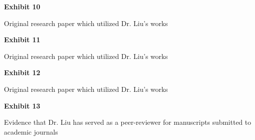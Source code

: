 \documentclass{article}
\begin{document}


\vspace*{\fill}

\begin{center}

{\LARGE \bf
Exhibit 10
}

\vspace{10\baselineskip}

{\large Original research paper which utilized Dr. Liu’s works}

\end{center}
\vspace*{\fill}



\vspace*{\fill}

\begin{center}

{\LARGE \bf
Exhibit 11
}

\vspace{10\baselineskip}

{\large Original research paper which utilized Dr. Liu’s works}

\end{center}
\vspace*{\fill}



\vspace*{\fill}

\begin{center}

{\LARGE \bf
Exhibit 12
}

\vspace{10\baselineskip}

{\large Original research paper which utilized Dr. Liu’s works}

\end{center}
\vspace*{\fill}





\vspace*{\fill}

\begin{center}

{\LARGE \bf
Exhibit 13
}

\vspace{10\baselineskip}

{\large Evidence that Dr. Liu has served as a peer-reviewer for manuscripts submitted to academic journals}

\end{center}
\vspace*{\fill}
\end{document}

